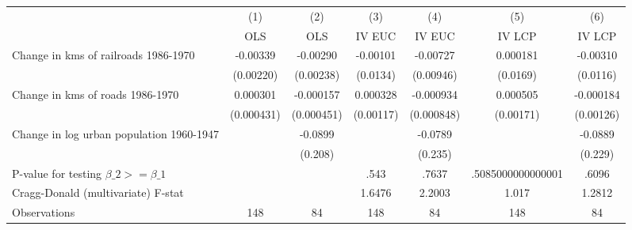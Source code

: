 {
\def\sym#1{\ifmmode^{#1}\else\(^{#1}\)\fi}
\begin{tabular}{l*{6}{c}}
\hline\hline
                &\multicolumn{1}{c}{(1)}&\multicolumn{1}{c}{(2)}&\multicolumn{1}{c}{(3)}&\multicolumn{1}{c}{(4)}&\multicolumn{1}{c}{(5)}&\multicolumn{1}{c}{(6)}\\
                &\multicolumn{1}{c}{OLS}&\multicolumn{1}{c}{OLS}&\multicolumn{1}{c}{IV EUC}&\multicolumn{1}{c}{IV EUC}&\multicolumn{1}{c}{IV LCP}&\multicolumn{1}{c}{IV LCP}\\
\hline
Change in kms of railroads 1986-1970& -0.00339         & -0.00290         & -0.00101         & -0.00727         & 0.000181         & -0.00310         \\
                &(0.00220)         &(0.00238)         & (0.0134)         &(0.00946)         & (0.0169)         & (0.0116)         \\
[1em]
Change in kms of roads 1986-1970& 0.000301         &-0.000157         & 0.000328         &-0.000934         & 0.000505         &-0.000184         \\
                &(0.000431)         &(0.000451)         &(0.00117)         &(0.000848)         &(0.00171)         &(0.00126)         \\
[1em]
Change in log urban population 1960-1947&                  &  -0.0899         &                  &  -0.0789         &                  &  -0.0889         \\
                &                  &  (0.208)         &                  &  (0.235)         &                  &  (0.229)         \\
\hline
P-value for testing $\beta\_{2} >= \beta\_{1}$&                  &                  &     .543         &    .7637         &.5085000000000001         &    .6096         \\
Cragg-Donald (multivariate) F-stat&                  &                  &   1.6476         &   2.2003         &    1.017         &   1.2812         \\
Observations    &      148         &       84         &      148         &       84         &      148         &       84         \\
\hline\hline
\end{tabular}
}
